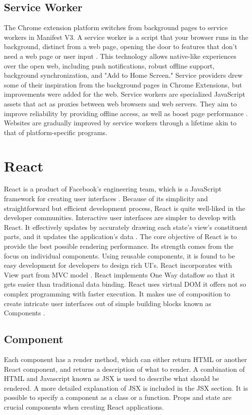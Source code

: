 \subsection{Service Worker}
The Chrome extension platform switches from background pages to service workers in Manifest V3. A service worker is a script that your browser runs in the background, distinct from a web page, opening the door to features that don't need a web page or user input \autocite{chrome2021service}. This technology allows native-like experiences over the open web, including push notifications, robust offline support, background synchronization, and "Add to Home Screen." Service providers drew some of their inspiration from the background pages in Chrome Extensions, but improvements were added for the web.
Service workers are specialized JavaScript assets that act as proxies between web browsers and web servers. They aim to improve reliability by providing offline access, as well as boost page performance \autocite{chrome2021service}. Websites are gradually improved by service workers through a lifetime akin to that of platform-specific programs.


\section{React}
React is a product of Facebook's engineering team, which is a JavaScript framework for creating user interfaces \autocite{gackenheimer2015introducing}. Because of its simplicity and straightforward but efficient development process, React is quite well-liked in the developer communities. Interactive user interfaces are simpler to develop with React. It effectively updates by accurately drawing each state's view's constituent parts, and it updates the application's data \autocite{islam2017reactjs}. The core objective of React is to provide the best possible rendering performance. Its strength comes from the focus on individual components. Using reusable components, it is found to be easy development for developers to design rich UI's. React incorporates with View part from MVC model \autocite{maratkar2021re}. React implements One Way dataflow so that it gets easier than traditional data binding. React uses virtual DOM it offers not so complex programming with faster execution. It makes use of composition to create intricate user interfaces out of simple building blocks known as Components \autocite{david2020building}.

\subsection{Component}
Each component has a render method, which can either return HTML or another React component, and returns a description of what to render. A combination of HTML and Javascript known as JSX is used to describe what should be rendered. A more detailed explanation of JSX is included in the JSX section. It is possible to specify a component as a class or a function. Props and state are crucial components when creating React applications.

